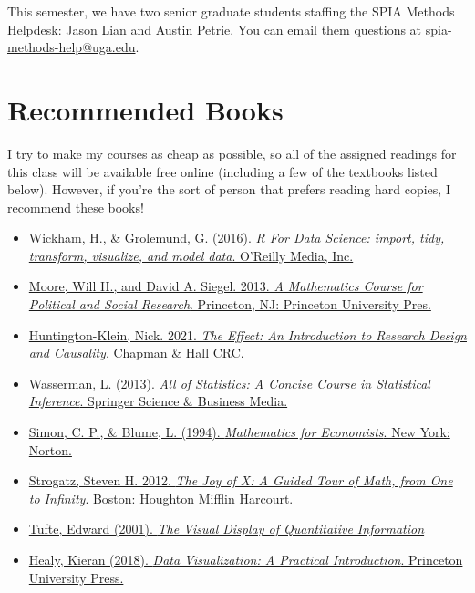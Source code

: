 \documentclass[11pt, letterpaper]{article}
\begin{document}
This semester, we have two senior graduate students staffing the SPIA Methods Helpdesk: Jason Lian and Austin Petrie. You can email them questions at \href{mailto:spia-methods-help@uga.edu}{spia-methods-help@uga.edu}.


\section*{Recommended Books}
I try to make my courses as cheap as possible, so all of the assigned readings for this class will be available free online (including a few of the textbooks listed below). However, if you're the sort of person that prefers reading hard copies, I recommend these books!

\begin{itemize}
\item \href{https://r4ds.had.co.nz/}{Wickham, H., \& Grolemund, G. (2016). \textit{R For Data Science: import, tidy, transform, visualize, and model data}. O'Reilly Media, Inc.}

\item \href{https://ebookcentral.proquest.com/lib/ugalib/detail.action?pq-origsite=primo&docID=1205618}{Moore, Will H., and David A. Siegel. 2013. \textit{A Mathematics Course for Political and Social Research}. Princeton, NJ: Princeton University Pres.}

\item \href{https://theeffectbook.net/index.html.}{Huntington-Klein, Nick. 2021. \textit{The Effect: An Introduction to Research Design and Causality}. Chapman \& Hall CRC.}


\item \href{https://www.amazon.com/All-Statistics-Statistical-Inference-Springer/dp/1441923225}{Wasserman, L. (2013). \textit{All of Statistics: A Concise Course in Statistical Inference}. Springer Science \& Business Media.}
\item \href{https://www.amazon.com/Mathematics-Economists-Carl-P-Simon/dp/0393957330}{Simon, C. P., \& Blume, L. (1994). \textit{Mathematics for Economists}. New York: Norton.}
\item \href{https://ebookcentral.proquest.com/lib/ugalib/reader.action?docID=3304559}{Strogatz, Steven H. 2012. \textit{The Joy of X: A Guided Tour of Math, from One to Infinity}. Boston: Houghton Mifflin Harcourt.}
\item \href{https://www.amazon.com/Visual-Display-Quantitative-Information/dp/1930824130}{Tufte, Edward (2001). \textit{The Visual Display of Quantitative Information}}
\item \href{https://socviz.co/}{Healy, Kieran (2018). \textit{Data Visualization: A Practical Introduction}. Princeton University Press.} 
\end{itemize} 
\end{document}
